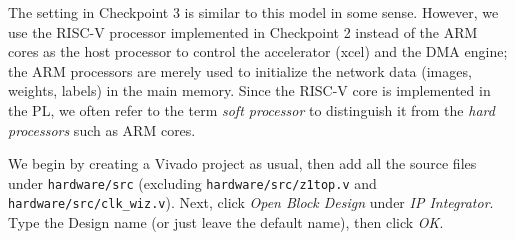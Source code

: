 \documentclass[11pt]{article}
\begin{document}
\begin{center}
\end{center}

The setting in Checkpoint 3 is similar to this model in some sense. However, we use the RISC-V processor implemented in Checkpoint 2 instead of the ARM cores as the host processor to control the accelerator (xcel) and the DMA engine; the ARM processors are merely used to initialize the network data (images, weights, labels) in the main memory. Since the RISC-V core is implemented in the PL, we often refer to the term \textit{soft processor} to distinguish it from the \textit{hard processors} such as ARM cores.

We begin by creating a Vivado project as usual, then add all the source files under \verb|hardware/src| (excluding \verb|hardware/src/z1top.v| and \verb|hardware/src/clk_wiz.v|).
Next, click \emph{Open Block Design} under \emph{IP Integrator}. Type the Design name (or just leave the default name), then click \emph{OK}.

\begin{center}
\end{center}
\end{document}
